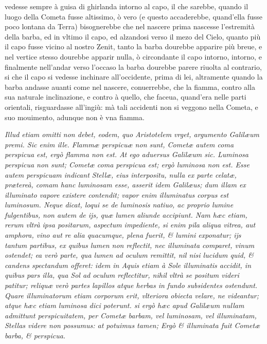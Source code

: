 \documentclass[11pt,twoside,openany]{book}
\begin{document}
vedesse sempre à guisa di ghirlanda intorno al capo, il che sarebbe, quando il luogo della Cometa fusse altissimo, ò vero (e questo accaderebbe, quand'ella fusse poco lontana da Terra) bisognerebbe che nel nascere prima nascesse l'estremità della barba, ed in vltimo il capo, ed alzandosi verso il mezo del Cielo, quanto più il capo fusse vicino al nostro Zenit, tanto la barba dourebbe apparire più breue, e nel vertice stesso dourebbe apparir nulla, ò circondante il capo intorno, intorno, e finalmente nell'andar verso l'occaso la barba dourebbe parere riuolta al contrario, si che il capo si vedesse inchinare all'occidente, prima di lei, altramente quando la barba andasse auanti come nel nascere, conuerrebbe, che la fiamma, contro alla sua naturale inclinazione, e contro à quello, che faceua, quand'era nelle parti orientali, risguardasse all'ingiù: mà tali accidenti non si veggono nella Cometa, e suo mouimento, adunque non è vna fiamma.



\par\bigskip\noindent{}\enspace \textit{Illud etiam omitti non debet, eodem, quo Aristotelem vrget, argumento Galilæum premi. Sic enim ille. Flammæ perspicuæ non sunt, Cometæ autem coma perspicua est, ergò flamma non est. At ego aduersus Galilæum sic. Luminosa perspicua non sunt; Cometæ coma perspicua est; ergò luminosa non est. Esse autem perspicuam indicant Stellæ, eius interpositu, nulla ex parte celatæ, prætereà, comam hanc luminosam esse, asserit idem Galilæus; dum illam ex illuminato vapore existere contendit; vapor enim illuminatus corpus est luminosum. Neque dicat, loqui se de luminosis natiuo, ac proprio lumine fulgentibus, non autem de ijs, quæ lumen aliunde accipiunt. Nam hæc etiam, rerum vltrà ipsa positarum, aspectum impediente, si enim pila aliqua vitrea, aut amphora, vino aut re alia quacumque, plena fuerit, \& lumini exponatur; ijs tantum partibus, ex quibus lumen non reflectit, nec illuminata comparet, vinum ostendet; ea verò parte, qua lumen ad oculum remittit, nil nisi lucidum quid, \& candens spectandum offeret: idem in Aquis etiam à Sole illuminatis accidit, in quibus pars illa, qua Sol ad oculum reflectitur, nihil vltrà se positum videri patitur; reliquæ verò partes lapillos atque herbas in fundo subsidentes ostendunt. Quare illuminatorum etiam corporum erit, vlteriora obiecta velare, ne videantur; atque hæc etiam luminosa dici poterunt. si ergò hæc apud Galilæum nullam admittunt perspicuitatem, per Cometæ }\textit{barbam, vel luminosam, vel illuminatam, Stellas videre non possumus: at potuimus tamen; Ergò \& illuminata fuit Cometæ barba, \& perspicua.}
\end{document}
